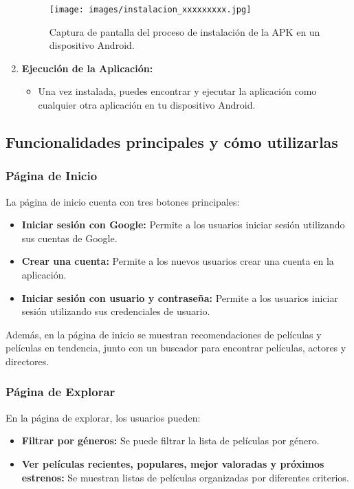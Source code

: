 \documentclass{article}
\begin{document}
\begin{enumerate}
        \begin{figure}[h]
                \centering
                \texttt{[image: images/instalacion\_xxxxxxxxx.jpg]}
                \caption{Captura de pantalla del proceso de instalación de la APK en un dispositivo Android.}
                \label{fig:instalacion_apk}
            \end{figure}

        \item \textbf{Ejecución de la Aplicación:}
            \begin{itemize}
                \item Una vez instalada, puedes encontrar y ejecutar la aplicación como cualquier otra aplicación en tu dispositivo Android.
            \end{itemize}
    \end{enumerate}

    \subsection{Funcionalidades principales y cómo utilizarlas}

    \subsubsection{Página de Inicio}
    La página de inicio cuenta con tres botones principales:
    \begin{itemize}
        \item \textbf{Iniciar sesión con Google:} Permite a los usuarios iniciar sesión utilizando sus cuentas de Google.
        \item \textbf{Crear una cuenta:} Permite a los nuevos usuarios crear una cuenta en la aplicación.
        \item \textbf{Iniciar sesión con usuario y contraseña:} Permite a los usuarios iniciar sesión utilizando sus credenciales de usuario.
    \end{itemize}
    Además, en la página de inicio se muestran recomendaciones de películas y películas en tendencia, junto con un buscador para encontrar películas, actores y directores.

    \subsubsection{Página de Explorar}
    En la página de explorar, los usuarios pueden:
    \begin{itemize}
        \item \textbf{Filtrar por géneros:} Se puede filtrar la lista de películas por género.
        \item \textbf{Ver películas recientes, populares, mejor valoradas y próximos estrenos:} Se muestran listas de películas organizadas por diferentes criterios.
    \end{itemize}
\end{document}
